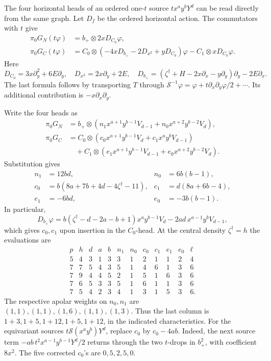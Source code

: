 \documentclass[11pt]{article}
\theoremstyle{plain}
\theoremstyle{definition}
\theoremstyle{remark}
\numberwithin{equation}{section}
\begin{document}
The four horizontal heads of an ordered
one-\(t\) source \(tx^ay^bY^d\) can be read directly from the same graph.
Let \(D_f\) be the ordered horizontal action.
The commutators with \(t\) give
\[
\begin{aligned}
 \pi_0G_N(t\varphi)&=b_+\otimes2xD_{C_0}\varphi,\\
 \pi_0G_C(t\varphi)&=
 C_0\otimes(-4xD_{b_+}-2D_{x^2}+yD_{C_0})\varphi
                  -C_1\otimes xD_{C_0}\varphi .
\end{aligned}
\]
Here
\[
 D_{C_0}=3x\partial_y^2+6E\partial_y,\quad
 D_{x^2}=2x\partial_y+2E,\quad
 D_{b_+}=(\zeta^\dagger+H-2x\partial_x-y\partial_y)\partial_y
                                                     -2E\partial_x .
\]
The last formula follows by transporting \(T\) through
\(\mathscr S^{-1}\varphi=\varphi+t\partial_x\partial_y\varphi/2+\cdots\).
Its additional contribution is \(-x\partial_x\partial_y\).

Write the four heads as
\[
\begin{aligned}
 \pi_0G_N&=b_+\otimes
 (n_1x^{a+1}y^{b-1}V_{d-1}+n_0x^{a+2}y^{b-2}V_d),\\
 \pi_0G_C&=C_0\otimes
 (c_0x^{a+1}y^{b-1}V_d+c_1x^ay^bV_{d-1})\\
 &\quad+C_1\otimes
 (e_1x^{a+1}y^{b-1}V_{d-1}+e_0x^{a+2}y^{b-2}V_d).
\end{aligned}
\]
Substitution gives
\begin{equation}\label{eq:one-t-six-coefficients}
\begin{aligned}
 n_1&=12bd,&n_0&=6b(b-1),\\
 c_0&=b(8a+7b+4d-4\zeta^\dagger-11),&
 c_1&=d(8a+6b-4),\\
 e_1&=-6bd,&e_0&=-3b(b-1).
\end{aligned}
\end{equation}
In particular,
\[
 D_{b_+}\varphi
 =b(\zeta^\dagger-d-2a-b+1)x^ay^{b-1}V_d
                -2ad\,x^{a-1}y^bV_{d-1},
\]
which gives \(c_0,c_1\) upon insertion in the \(C_0\)-head.
At the central density \(\zeta^\dagger=h\) the evaluations are
\[
\begin{array}{ccc|cc|cc|cc|cc|c}
p&h&d&a&b&n_1&n_0&c_0&c_1&e_1&e_0&\ell\\ \hline
5&4&3&1&3&3&1&2&1&1&2&4\\
7&7&5&4&3&5&1&4&6&1&3&6\\
7&9&4&4&5&2&1&5&1&6&3&6\\
7&6&5&3&3&5&1&6&1&1&3&6\\
7&5&4&2&3&4&1&3&1&5&3&6 .
\end{array}
\]
The respective apolar weights on \(n_0,n_1\) are
\((1,1),(1,1),(1,6),(1,1),(1,3)\).
Thus the last column is
\(1+3,1+5,1+12,1+5,1+12\), in the indicated characteristics.
For the equivariant sources \(t\mathscr S(x^ay^b)Y^d\),
replace \(c_0\) by \(c_0-4ab\).
Indeed, the next source term
\(-ab\,t^2x^{a-1}y^{b-1}Y^d/2\) returns through the two
\(t\)-drops in \(b_+^2\), with coefficient \(8x^2\).
The five corrected \(c_0\)'s are \(0,5,2,5,0\).
\end{document}
